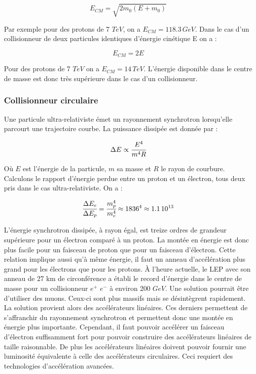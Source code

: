   \begin{equation}
   E_{CM} = \sqrt{2 m_0 (E + m_0)}
  \end{equation}

  Par exemple pour des protons de 7 $TeV$, on a $E_{CM} = 118.3 \, GeV$. Dans le cas d'un collisionneur de deux particules identiques d'\'energie cin\'etique E on a :
  
  \begin{equation}
   E_{CM} = 2 E
  \end{equation}

   Pour des protons de 7 $TeV$ on a $E_{CM} = 14 \, TeV$. L'\'energie disponible dans le centre de masse est donc tr\`es sup\'erieure dans le cas d'un collisionneur.
    
  \subsubsection{Collisionneur circulaire}
  
  Une particule ultra-relativiste \'emet un rayonnement synchrotron lorsqu'elle parcourt une trajectoire courbe. La puissance dissip\'ee est donn\'ee par :

  \begin{equation}
   \Delta E \propto \cfrac{E^4}{m^4R}
  \end{equation}
  
  O\`u $E$ est l'\'energie de la particule, $m$ sa masse et $R$ le rayon de courbure. Calculons le rapport d'\'energie perdue entre un proton et un \'electron, tous deux pris dans le cas ultra-relativiste. On a :
  
  \begin{equation}
   \cfrac{\Delta E_e}{\Delta E_p} = \cfrac{m_p^4}{m_e^4} \approx 1836^4 \approx 1.1 \, 10^{13}
  \end{equation}

  L'\'energie synchrotron dissip\'ee, \`a rayon \'egal, est treize ordres de grandeur sup\'erieure pour un \'electron compar\'e \`a un proton. La mont\'ee en \'energie est donc plus facile pour un faisceau de proton que pour un faisceau d'\'electron. Cette relation implique aussi qu'\`a m\^eme \'energie, il faut un anneau d'acc\'el\'eration plus grand pour les \'electrons que pour les protons. \`A l'heure actuelle, le LEP avec son anneau de 27 km de circonf\'erence a \'etabli le record d'\'energie dans le centre de masse pour un collisionneur $e^+$ $e^-$ \`a environ 200 $GeV$. Une solution pourrait \^etre d'utiliser des muons. Ceux-ci sont plus massifs mais se d\'esint\`egrent rapidement. La solution provient alors des acc\'el\'erateurs lin\'eaires. Ces derniers permettent de s'affranchir du rayonnement synchrotron et permettent donc une mont\'ee en \'energie plus importante. Cependant, il faut pouvoir acc\'el\'erer un faisceau d'\'electron suffisamment fort pour pouvoir construire des acc\'el\'erateurs lin\'eaires de taille raisonnable. De plus les acc\'el\'erateurs lin\'eaires doivent pouvoir fournir une luminosit\'e équivalente \`a celle des acc\'el\'erateurs circulaires. Ceci requiert des technologies d'acc\'el\'eration avanc\'ees.
   
